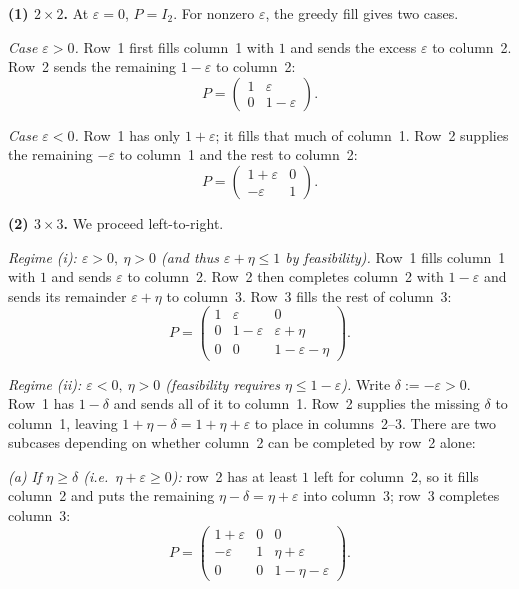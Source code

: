 \documentclass[11pt,a4paper]{article}
\theoremstyle{exostyle}
\begin{document}
\begin{solution}
\textbf{(1) $2\times2$.} At $\varepsilon=0$, $P=I_2$. For nonzero $\varepsilon$, the greedy fill gives two cases.

\emph{Case $\varepsilon>0$.} Row~1 first fills column~1 with $1$ and sends the excess $\varepsilon$ to column~2. Row~2 sends the remaining $1-\varepsilon$ to column~2:
\[
P=\begin{pmatrix}1&\varepsilon\\[1pt] 0&1-\varepsilon\end{pmatrix}.
\]

\emph{Case $\varepsilon<0$.} Row~1 has only $1+\varepsilon$; it fills that much of column~1. Row~2 supplies the remaining $-\varepsilon$ to column~1 and the rest to column~2:
\[
P=\begin{pmatrix}1+\varepsilon&0\\[1pt] -\varepsilon&1\end{pmatrix}.
\]

\smallskip
\textbf{(2) $3\times3$.} We proceed left-to-right.

\emph{Regime (i): $\varepsilon>0,\ \eta>0$ (and thus $\varepsilon+\eta\le1$ by feasibility).}
Row~1 fills column~1 with $1$ and sends $\varepsilon$ to column~2. Row~2 then completes column~2 with $1-\varepsilon$ and sends its remainder $\varepsilon+\eta$ to column~3. Row~3 fills the rest of column~3:
\[
P=\begin{pmatrix}
1 & \varepsilon & 0\\
0 & 1-\varepsilon & \varepsilon+\eta\\
0 & 0 & 1-\varepsilon-\eta
\end{pmatrix}.
\]

\emph{Regime (ii): $\varepsilon<0,\ \eta>0$ (feasibility requires $\eta\le 1-\varepsilon$).}
Write $\delta:=-\varepsilon>0$. Row~1 has $1-\delta$ and sends all of it to column~1. Row~2 supplies the missing $\delta$ to column~1, leaving $1+\eta-\delta=1+\eta+\varepsilon$ to place in columns~2--3. There are two subcases depending on whether column~2 can be completed by row~2 alone:

\hspace{1em}\emph{(a) If $\eta\ge\delta$ (i.e.\ $\eta+\varepsilon\ge0$):}
row~2 has at least $1$ left for column~2, so it fills column~2 and puts the remaining $\eta-\delta=\eta+\varepsilon$ into column~3; row~3 completes column~3:
\[
P=\begin{pmatrix}
1+\varepsilon & 0 & 0\\
-\varepsilon & 1 & \eta+\varepsilon\\
0 & 0 & 1-\eta-\varepsilon
\end{pmatrix}.
\]


\end{solution}
\end{document}
